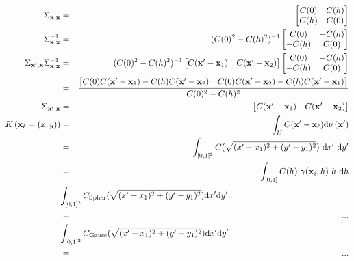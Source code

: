 \documentclass[12pt]{article}
\theoremstyle{definition}
\theoremstyle{remark}
\newcommand{\dominantU}{\nu}
\newcommand{\Covariogram}{C}
\newcommand{\derive}{\mathrm{d}}
\newcommand{\position}{\mathbf{x}}
\begin{document}
\begin{eqnarray*}
\Sigma_{\position,\position}&=&
    \begin{bmatrix}\Covariogram(0)&\Covariogram(h)\\\Covariogram(h)&\Covariogram(0)\end{bmatrix}\\
\Sigma_{\position,\position}^{-1}&=&
    (\Covariogram(0)^2-\Covariogram(h)^2)^{-1}\begin{bmatrix}\Covariogram(0)&-\Covariogram(h)\\-\Covariogram(h)&\Covariogram(0)\end{bmatrix}\\
\Sigma_{\position',\position}\Sigma_{\position,\position}^{-1}
    &=&(\Covariogram(0)^2-\Covariogram(h)^2)^{-1}
        \begin{bmatrix}\Covariogram(\position'-\position_1)&\Covariogram(\position'-\position_2)\end{bmatrix}\begin{bmatrix}\Covariogram(0)&-\Covariogram(h)\\-\Covariogram(h)&\Covariogram(0)\end{bmatrix}\\
    &=&\frac{\begin{bmatrix}
        \Covariogram(0)\Covariogram(\position'-\position_1)-\Covariogram(h)\Covariogram(\position'-\position_2)&              \Covariogram(0)\Covariogram(\position'-\position_2)-\Covariogram(h)\Covariogram(\position'-\position_1)\end{bmatrix}}{\Covariogram(0)^2-\Covariogram(h)^2}\\
\Sigma_{\position',\position}&=&\begin{bmatrix}\Covariogram(\position'-\position_1)&\Covariogram(\position'-\position_2)\end{bmatrix}\\
K\left(\position_\ell=(x,y)\right)
&=&
\int_{U}\Covariogram(\position'-\position_\ell)\derive\dominantU\left(\position'\right)\\
&=&\int_{[0,1]^2}\Covariogram(\sqrt{(x'-x_1)^2+(y'-y_1)^2})~\derive x'~\derive y'\\&=&
\int_{[0,1]}\Covariogram(h)~\gamma(\position_i,h)~h~\derive h\\
\lefteqn{\int_{[0,1]^2}\Covariogram_{\text{Spher}}(\sqrt{(x'-x_1)^2+(y'-y_1)^2})\derive x'\derive y'}\\&=&...\\
\lefteqn{\int_{[0,1]^2}\Covariogram_{\text{Gauss}}(\sqrt{(x'-x_1)^2+(y'-y_1)^2})\derive x'\derive y'}\\&=&...\\

\end{eqnarray*}
\end{document}
